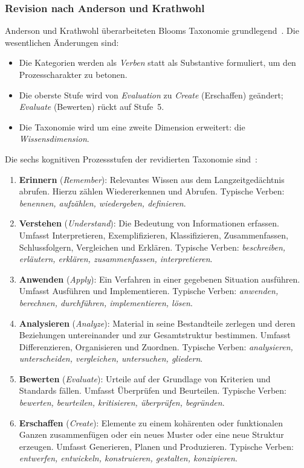\subsubsection{Revision nach Anderson und Krathwohl}

Anderson und Krathwohl überarbeiteten Blooms Taxonomie grundlegend~\cite{anderson2001taxonomy}.
Die wesentlichen Änderungen sind:
\begin{itemize}
    \item Die Kategorien werden als \emph{Verben} statt als Substantive formuliert, um den Prozesscharakter zu betonen.
    \item Die oberste Stufe wird von \emph{Evaluation} zu \emph{Create} (Erschaffen) geändert; \emph{Evaluate} (Bewerten) rückt auf Stufe~5.
    \item Die Taxonomie wird um eine zweite Dimension erweitert: die \emph{Wissensdimension}.
\end{itemize}

Die sechs kognitiven Prozessstufen der revidierten Taxonomie sind~\cite{anderson2001taxonomy,krathwohl2002revision}:

\begin{enumerate}
    \item \textbf{Erinnern} (\emph{Remember}): Relevantes Wissen aus dem Langzeitgedächtnis abrufen. Hierzu zählen Wiedererkennen und Abrufen. Typische Verben: \emph{benennen, aufzählen, wiedergeben, definieren}.
    \item \textbf{Verstehen} (\emph{Understand}): Die Bedeutung von Informationen erfassen. Umfasst Interpretieren, Exemplifizieren, Klassifizieren, Zusammenfassen, Schlussfolgern, Vergleichen und Erklären. Typische Verben: \emph{beschreiben, erläutern, erklären, zusammenfassen, interpretieren}.
    \item \textbf{Anwenden} (\emph{Apply}): Ein Verfahren in einer gegebenen Situation ausführen. Umfasst Ausführen und Implementieren. Typische Verben: \emph{anwenden, berechnen, durchführen, implementieren, lösen}.
    \item \textbf{Analysieren} (\emph{Analyze}): Material in seine Bestandteile zerlegen und deren Beziehungen untereinander und zur Gesamtstruktur bestimmen. Umfasst Differenzieren, Organisieren und Zuordnen. Typische Verben: \emph{analysieren, unterscheiden, vergleichen, untersuchen, gliedern}.
    \item \textbf{Bewerten} (\emph{Evaluate}): Urteile auf der Grundlage von Kriterien und Standards fällen. Umfasst Überprüfen und Beurteilen. Typische Verben: \emph{bewerten, beurteilen, kritisieren, überprüfen, begründen}.
    \item \textbf{Erschaffen} (\emph{Create}): Elemente zu einem kohärenten oder funktionalen Ganzen zusammenfügen oder ein neues Muster oder eine neue Struktur erzeugen. Umfasst Generieren, Planen und Produzieren. Typische Verben: \emph{entwerfen, entwickeln, konstruieren, gestalten, konzipieren}.
\end{enumerate}


